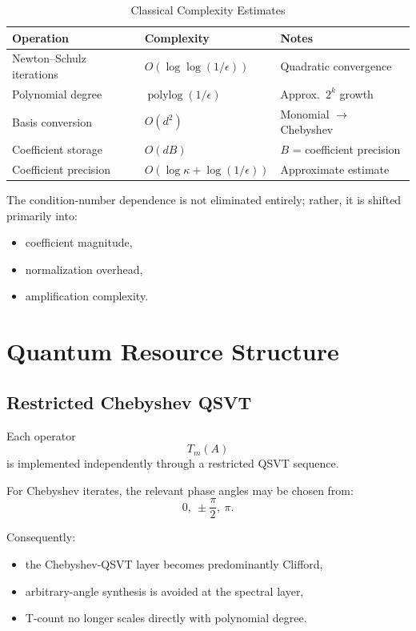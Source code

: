 \documentclass[12pt,a4paper]{article}
\newcommand{\polylog}{\operatorname{polylog}}
\begin{document}
\begin{table}[h]
\centering
\caption{Classical Complexity Estimates}
\label{tab:classical}
\begin{tabular}{lll}
\toprule
\textbf{Operation} & \textbf{Complexity} & \textbf{Notes} \\
\midrule
Newton--Schulz iterations & $O(\log\log(1/\epsilon))$ & Quadratic convergence \\
Polynomial degree & $\polylog(1/\epsilon)$ & Approx.\ $2^k$ growth \\
Basis conversion & $O(d^2)$ & Monomial $\to$ Chebyshev \\
Coefficient storage & $O(dB)$ & $B$ = coefficient precision \\
Coefficient precision & $O(\log\kappa+\log(1/\epsilon))$ & Approximate estimate \\
\bottomrule
\end{tabular}
\end{table}

The condition-number dependence is not eliminated entirely; rather, it is shifted primarily into:

\begin{itemize}
    \item coefficient magnitude,
    \item normalization overhead,
    \item amplification complexity.
\end{itemize}


\section{Quantum Resource Structure}

\subsection{Restricted Chebyshev QSVT}

Each operator
\[
T_m(A)
\]
is implemented independently through a restricted QSVT sequence.

For Chebyshev iterates, the relevant phase angles may be chosen from:
\[
0,\ \pm\frac{\pi}{2},\ \pi.
\]

Consequently:

\begin{itemize}
    \item the Chebyshev-QSVT layer becomes predominantly Clifford,
    \item arbitrary-angle synthesis is avoided at the spectral layer,
    \item T-count no longer scales directly with polynomial degree.
\end{itemize}
\end{document}
